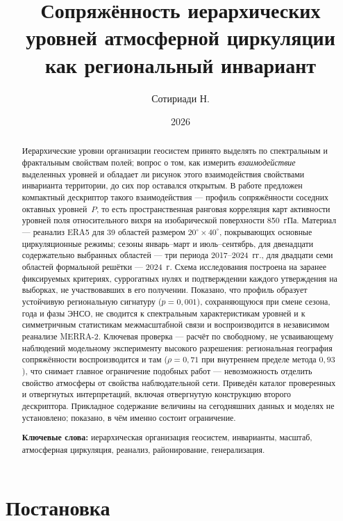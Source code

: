 \documentclass[11pt,a4paper]{article}
\title{Сопряжённость иерархических уровней атмосферной циркуляции\\
как региональный инвариант}
\author{Сотириади Н.}
\date{2026}
\begin{document}
\maketitle

\begin{abstract}
Иерархические уровни организации геосистем принято выделять по спектральным и фрактальным свойствам полей; вопрос о том, как измерить \emph{взаимодействие} выделенных уровней и обладает ли рисунок этого взаимодействия свойствами инварианта территории, до сих пор оставался открытым. В работе предложен компактный дескриптор такого взаимодействия --- профиль сопряжённости соседних октавных уровней~$P$, то есть пространственная ранговая корреляция карт активности уровней поля относительного вихря на изобарической поверхности 850~гПа. Материал --- реанализ ERA5 для 39 областей размером $20^\circ\times40^\circ$, покрывающих основные циркуляционные режимы; сезоны январь--март и июль--сентябрь, для двенадцати содержательно выбранных областей --- три периода 2017--2024~гг., для двадцати семи областей формальной решётки --- 2024~г. Схема исследования построена на заранее фиксируемых критериях, суррогатных нулях и подтверждении каждого утверждения на выборках, не участвовавших в его получении. Показано, что профиль образует устойчивую региональную сигнатуру ($p=0{,}001$), сохраняющуюся при смене сезона, года и фазы ЭНСО, не сводится к спектральным характеристикам уровней и к симметричным статистикам межмасштабной связи и воспроизводится в независимом реанализе MERRA-2. Ключевая проверка --- расчёт по свободному, не усваивающему наблюдений модельному эксперименту высокого разрешения: региональная география сопряжённости воспроизводится и там ($\rho=0{,}71$ при внутреннем пределе метода $0{,}93$), что снимает главное ограничение подобных работ --- невозможность отделить свойство атмосферы от свойства наблюдательной сети. Приведён каталог проверенных и отвергнутых интерпретаций, включая отвергнутую конструкцию второго дескриптора. Прикладное содержание величины на сегодняшних данных и моделях не установлено; показано, в чём именно состоит ограничение.

\smallskip
\noindent\textbf{Ключевые слова:} иерархическая организация геосистем, инварианты, масштаб, атмосферная циркуляция, реанализ, районирование, генерализация.
\end{abstract}

\section{Постановка}
\label{sec:intro}
\end{document}
